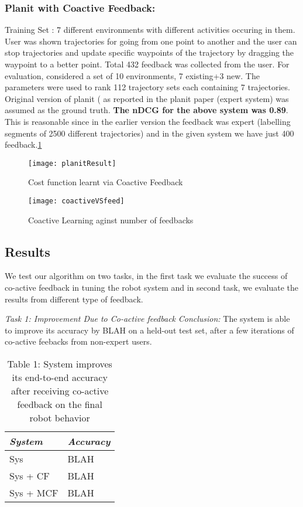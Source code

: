 	\subsubsection{Planit with Coactive Feedback:} 
		Training Set : 7 different environments with different activities occuring in them. User was shown trajectories for going from one point to another and the user can stop trajectories and update specific waypoints of the trajectory by dragging the waypoint to a better point. Total 432 feedback was collected from the user. For evaluation, considered a set of 10 environments, 7 existing+3 new. The parameters were used to rank 112 trajectory sets each containing 7 trajectories. Original version of planit ( as reported in the planit paper (expert system) was assumed as the ground truth. \textbf{The nDCG for the above system was 0.89}. This is reasonable since in the earlier version the feedback was expert (labelling segments of 2500 different trajectories) and in the given system we have just 400 feedback.\ref{fig:planitResult} 
		\begin{figure}[h]
		\texttt{[image: planitResult]}
		\centering
		\caption{Cost function learnt via Coactive Feedback}
  		\label{fig:planitResult}
		\end{figure}


		\begin{figure}[h]
		\texttt{[image: coactiveVSfeed]}
		\centering
		\caption{Coactive Learning aginst number of feedbacks}
  		\label{fig:c1}
		\end{figure}




\subsection{Results} 
We test our algorithm on two tasks, in the first task we evaluate the success of co-active feedback in tuning the robot system and in second task, we evaluate the results from different type of feedback.

\noindent\textit{Task 1: Improvement Due to Co-active feedback}
\textit{Conclusion:} The system is able to improve its accuracy by BLAH on a held-out test set, after a few iterations of co-active feebacks from non-expert users.

\begin{table}
\label{tbl:tsk1}
\caption{Table 1: System improves its end-to-end accuracy after receiving co-active feedback on the final robot behavior}
\centering
\begin{tabular}{|l|l|}
\hline
\textit{System} & \textit{Accuracy} \\
\hline
Sys & BLAH \\
Sys + CF & BLAH \\
Sys + MCF & BLAH \\
\hline
\end{tabular}
\end{table}

